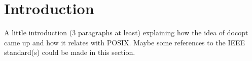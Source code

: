 \section{Introduction}

A little introduction (3 paragraphs at least) explaining how the idea of docopt came up and how it relates with POSIX. Maybe some references to the IEEE standard(s) could be made in this section.
